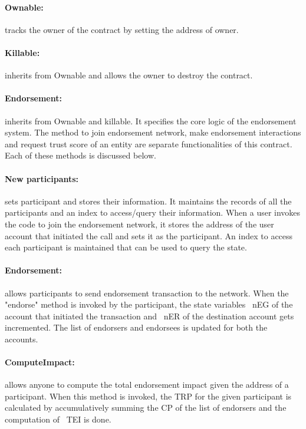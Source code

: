 \paragraph{Ownable:} tracks the owner of the contract by setting the address of
owner.
\paragraph{Killable:}inherits from Ownable and allows the owner to destroy the
contract.
\paragraph{Endorsement:}inherits from Ownable and killable. It specifies the
core logic of the endorsement system. The method to join endorsement network,
make endorsement interactions and request trust score of an entity are separate
functionalities of this contract. Each of these methods is discussed below. 
\paragraph{New participants:}sets participant and stores their information.
It maintains the records of all the participants and an index to access/query
their information. When a user invokes the code to join the endorsement
network, it stores the address of the user account that initiated the call and
sets it as the participant. An index to access each participant is maintained
that can be used to query the state. 
\paragraph{Endorsement:}allows participants to send endorsement transaction to
the network. When the "endorse" method is invoked by the participant, the state
variables ~\ac{nEG} of the account that initiated the transaction and ~\ac{nER}
of the destination account gets incremented. The list of endorsers and
endorsees is updated for both the accounts.
\paragraph{ComputeImpact:} allows anyone to compute the total endorsement
impact given the address of a participant. When this method is invoked, the
\ac{TRP} for the given participant is calculated by accumulatively summing the
\ac{CP} of the list of endorsers and the computation of ~\ac{TEI} is done.  
